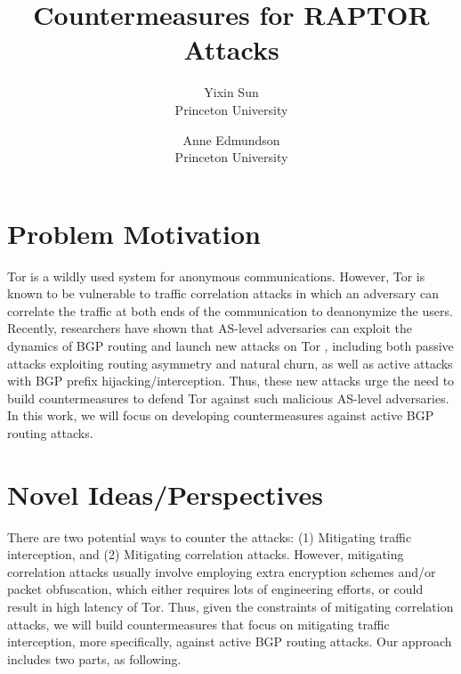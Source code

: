 \documentclass{acm_proc_article-sp}
\begin{document}
\date{}

\title{\Large \bf Countermeasures for RAPTOR Attacks}
\author{
 {\rm Yixin Sun}\\
 Princeton University
 \and
 {\rm Anne Edmundson}\\
 Princeton University
} %

\maketitle


\section{Problem Motivation}
Tor is a wildly used system for anonymous communications. However, Tor is known to be vulnerable to traffic correlation attacks in which an adversary can correlate the traffic at both ends of the communication to deanonymize the users. Recently, researchers have shown that AS-level adversaries can exploit the dynamics of BGP routing and launch new attacks on Tor \cite{sun2015raptor}, including both passive attacks exploiting routing asymmetry and natural churn, as well as active attacks with BGP prefix hijacking/interception. Thus, these new attacks urge the need to build countermeasures to defend Tor against such malicious AS-level adversaries. In this work, we will focus on developing countermeasures against active BGP routing attacks. 

\section{Novel Ideas/Perspectives}
There are two potential ways to counter the attacks: (1) Mitigating traffic interception, and (2) Mitigating correlation attacks. However, mitigating correlation attacks usually involve employing extra encryption schemes and/or packet obfuscation, which either requires lots of engineering efforts, or could result in high latency of Tor. Thus, given the constraints of mitigating correlation attacks, we will build countermeasures that focus on mitigating traffic interception, more specifically, against active BGP routing attacks. Our approach includes two parts, as following. 
\end{document}
